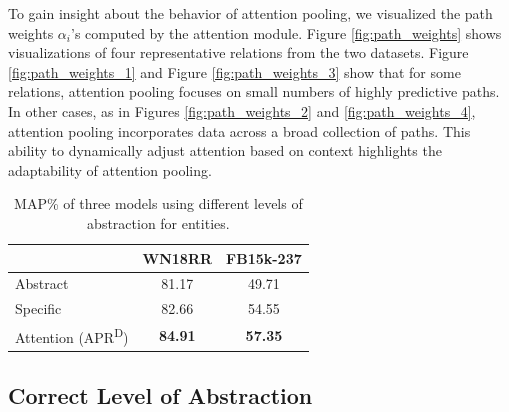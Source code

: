 \documentclass[letterpaper]{article} %
\begin{document}
To gain insight about the behavior of attention pooling, we visualized the path weights $\alpha_{i}$'s computed by the attention module. Figure \ref{fig:path_weights} shows visualizations of four representative relations from the two datasets. Figure \ref{fig:path_weights_1} and Figure \ref{fig:path_weights_3} show that for some relations, attention pooling focuses on small numbers of highly predictive paths. In other cases, as in Figures \ref{fig:path_weights_2} and \ref{fig:path_weights_4}, attention pooling incorporates data across a broad collection of paths. This ability to dynamically adjust attention based on context highlights the adaptability of attention pooling. %


\begin{table}[t]
\centering
\begin{tabular}{lcc}
\toprule
& WN18RR & FB15k-237 \\
\midrule
Abstract   & 81.17 &  49.71  \\
Specific      & 82.66  &  54.55 \\
Attention (APR\textsuperscript{D}) & \textbf{84.91} & \textbf{57.35} \\
\bottomrule
\end{tabular}
\caption{MAP\% of three models using different levels of abstraction for entities.}
\label{tab:attention_effect}
\end{table}

\subsection{Correct Level of Abstraction}
\end{document}

